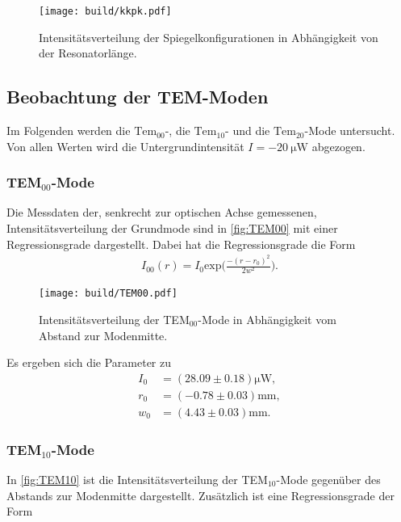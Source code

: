 \begin{figure}[H]
  \centering
  \texttt{[image: build/kkpk.pdf]}
  \caption {Intensitätsverteilung der Spiegelkonfigurationen in Abhängigkeit von der Resonatorlänge.}
  \label{fig:kkpk}
\end{figure}

\subsection{Beobachtung der TEM-Moden}
\label{subsec:Moden_aus}
Im Folgenden werden die $\text{Tem}_{00}$-, die $\text{Tem}_{10}$- und die $\text{Tem}_{20}$-Mode untersucht. Von allen Werten wird die Untergrundintensität $I = \qty{-20}{\micro\watt}$ abgezogen.

\subsubsection{TEM$_{00}$-Mode}
\label{subsubsec:00Mode}
Die Messdaten der, senkrecht zur optischen Achse gemessenen, Intensitätsverteilung der Grundmode sind in \autoref{fig:TEM00} mit einer Regressionsgrade dargestellt.
Dabei hat die Regressionsgrade die Form
\begin{align*}
  I_{00}(r) = I_0 \text{exp}\Biggl(\frac{-(r-r_0)^2}{2 w^2}\Biggr).
\end{align*}

\begin{figure}[H]
  \centering
  \texttt{[image: build/TEM00.pdf]}
  \caption {Intensitätsverteilung der TEM$_{00}$-Mode in Abhängigkeit vom Abstand zur Modenmitte.}
  \label{fig:TEM00}
\end{figure}

Es ergeben sich die Parameter zu
\begin{align*}
  I_{0} &= (28.09 \pm 0.18) \si{\micro\W},\\
  r_0 &= (-0.78 \pm 0.03) \si{\milli\meter},\\
  w_0 &= (4.43 \pm 0.03) \si{\milli\meter}.
  \label{eqn:Para00}
\end{align*}


\subsubsection{TEM$_{10}$-Mode}
\label{subsubsec:10Mode}
In \autoref{fig:TEM10} ist die Intensitätsverteilung der TEM$_{10}$-Mode gegenüber des Abstands zur Modenmitte dargestellt. Zusätzlich ist eine Regressionsgrade der Form

